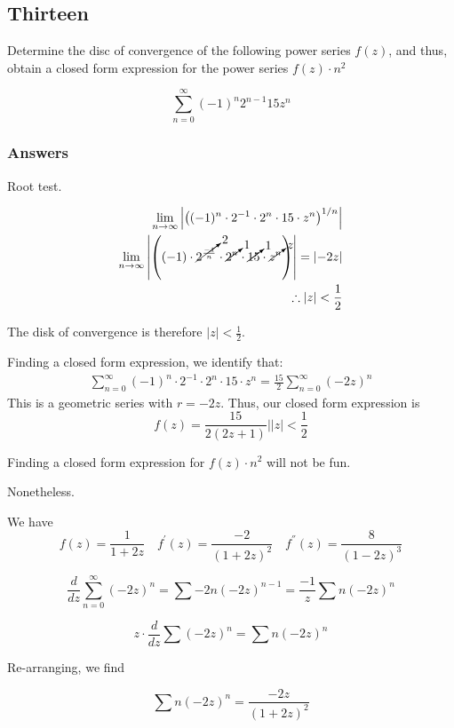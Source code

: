 \documentclass{article}
\begin{document}
\subsection*{Thirteen}

Determine the disc of convergence of the following power series $f(z)$, and thus, obtain a closed form expression for the power series $f(z) \cdot n^2$

\begin{equation}\label{c13}
\sum_{n=0}^{\infty} (-1)^n2^{n-1}15z^n
\end{equation}


\subsubsection*{Answers}
Root test.

\begin{align*}
\lim_{n\to\infty} \left|\left( (-1)^n \cdot 2^{-1} \cdot 2^n \cdot 15 \cdot z^n \right)^{1/n}\right|\\
\lim_{n\to\infty} \left|\left( (-1) \cdot \cancelto{2}{2^{\frac{-1}{n}}} \cdot \cancelto{1}{2^n} \cdot \cancelto{1}{15} \cdot \cancelto{z}{z^n} \right)\right| = \left|-2z\right| \\
\therefore \left|z\right| < \frac{1}{2}
\end{align*}

The disk of convergence is therefore $\left|z\right| < \frac{1}{2}$.

Finding a closed form expression, we identify that:
\begin{align*}
\sum_{n=0}^{\infty}  (-1)^n \cdot 2^{-1} \cdot 2^n \cdot 15 \cdot z^n = \frac{15}{2} \sum_{n=0}^{\infty} (-2z)^n
\end{align*}
This is a geometric series with $r = -2z$. Thus, our closed form expression is
\[
f(z) = \frac{15}{2(2z+1)} \Bigr| \left|z\right| < \frac{1}{2}
\]

Finding a closed form expression for $f(z) \cdot n^2$ will not be fun.

Nonetheless.

We have
\[
f(z) = \frac{1}{1+2z} \quad f^{'}(z) = \frac{-2}{(1+2z)^2} \quad f^{''}(z) = \frac{8}{(1-2z)^3}
\]

\[
\frac{d}{dz} \sum_{n=0}^{\infty} (-2z)^n = \sum -2n(-2z)^{n-1} = \frac{-1}{z} \sum n(-2z)^n
\]

\[
z \cdot \frac{d}{dz} \sum (-2z)^n = \sum n(-2z)^n
\]

Re-arranging, we find

\[
\sum n(-2z)^n = \frac{-2z}{(1+2z)^2}
\]
\end{document}
